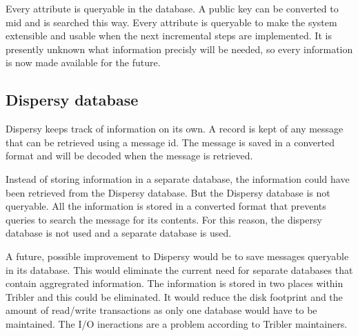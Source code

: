 Every attribute is queryable in the database.
A public key can be converted to mid and is searched this way.
Every attribute is queryable to make the system  extensible
and usable when the next incremental steps are implemented.
It is presently unknown what information precisly will be needed,
so every information is now made available for the future.

\subsection{Dispersy database}
Dispersy keeps track of information on its own.
A record is kept of any message that can be retrieved using a message id.
The message is saved in a converted format and will be decoded when the message is retrieved.

Instead of storing information in a separate database,
the information could have been retrieved from the Dispersy database.
But the Dispersy database is not queryable.
All the information is stored in a converted format
that prevents queries to search the message for its contents.
For this reason, the dispersy database is not used and a separate database is used.

A future, possible improvement to Dispersy would be to save messages queryable in its database.
This would eliminate the current need for separate databases that contain aggregrated information.
The information is stored in two places within Tribler and this could be eliminated.
It would reduce the disk footprint and the amount of read/write transactions
as only one database would have to be maintained.
The I/O ineractions are a problem according to Tribler maintainers.